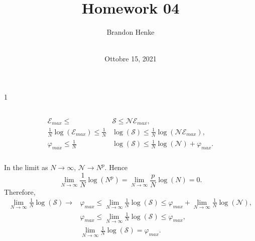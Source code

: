 \documentclass[a4paper,12pt,twoside]{article}
\title{Homework 04}
\author{
	Brandon Henke\\
	\course\\
	\professor
}
\date{Ottobre 15, 2021}
\newcommand{\mcols}{0}
\begin{document}

\maketitle
\if\mcols1
\begin{multicols*}{2}
\fi

\setcounter{section}{4}
\subsection{}%
\subsubsection{}
\begin{align}
	\mathcal{E}_{max} \leq &\mathcal{S} \leq \mathcal{N} \mathcal{E}_{max},\\
	\frac{1}{N}\log(\mathcal{E}_{max}) \leq \frac{1}{N}&\log(\mathcal{S}) \leq \frac{1}{N}\log(\mathcal{N} \mathcal{E}_{max}),\\
	\varphi_{max} \leq \frac{1}{N}&\log(\mathcal{S}) \leq \frac{1}{N}\log(\mathcal{N}) + \varphi_{max}.
\end{align}
\subsubsection{}
In the limit as $N\rightarrow\infty$, $\mathcal{N} \rightarrow N^p$.
Hence
\begin{equation}
	\lim_{N\rightarrow \infty} \frac{1}{N} \log(N^p) = \lim_{N\rightarrow \infty} \frac{p}{N} \log(N) = 0.
\end{equation}
Therefore,
\begin{align}
	\lim_{N\rightarrow\infty} \frac{1}{N}\log(\mathcal{S}) \rightarrow &\varphi_{max}
	\leq \lim_{N\rightarrow\infty} \frac{1}{N}\log(\mathcal{S})
	\leq \varphi_{max}+ \lim_{N\rightarrow\infty} \frac{1}{N}\log(\mathcal{N}),\\
	&\varphi_{max}
	\leq \lim_{N\rightarrow\infty} \frac{1}{N}\log(\mathcal{S})
	\leq \varphi_{max},\\
	&\lim_{N\rightarrow\infty} \frac{1}{N}\log(\mathcal{S}) = \varphi_{max}.
\end{align}
\subsection{}%
\subsection{}%

\end{multicols*}
\end{document}
